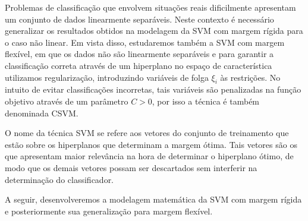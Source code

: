 \documentclass[12pt,a4paper]{scrartcl}
\theoremstyle{definition}%
\begin{document}
Problemas de classificação que envolvem situações reais dificilmente apresentam um conjunto de dados linearmente separáveis. Neste contexto é necessário generalizar os resultados obtidos na modelagem da SVM com margem rígida para o caso não linear. Em vista disso, estudaremos também a SVM com margem flexível, em que os dados não são linearmente separáveis e para garantir a classificação correta através de um hiperplano no espaço de característica utilizamos regularização, introduzindo variáveis de folga $\xi_{i}$ às restrições. No intuito de evitar classificações incorretas, tais variáveis são penalizadas na função objetivo através de um parâmetro $C>0$, por isso a técnica é também denominada CSVM.

O nome da técnica SVM se refere aos vetores do conjunto de treinamento que estão sobre os hiperplanos que determinam a margem ótima. Tais vetores são os que apresentam maior relevância na hora de determinar o hiperplano ótimo, de modo que os demais vetores possam ser descartados sem interferir na determinação do classificador. 

A seguir, desenvolveremos a modelagem matemática da SVM com margem rígida e posteriormente sua generalização para margem flexível.



\end{document}
